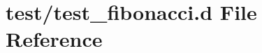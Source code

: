\hypertarget{test__fibonacci_8d}{\section{test/test\-\_\-fibonacci.d \-File \-Reference}
\label{d7/dfa/test__fibonacci_8d}
}
